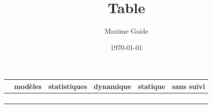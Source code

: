 \documentclass[11pt]{article}
\author{Maxime Gaide}
\date{\today}
\title{Table}
\begin{document}
\maketitle
\tableofcontents

\begin{center}
\begin{tabular}{llllll}
\hline
 & modèles & statistiques & dynamique & statique & sans suivi\\[0pt]
\hline
 &  &  &  &  & \\[0pt]
 &  &  &  &  & \\[0pt]
 &  &  &  &  & \\[0pt]
 &  &  &  &  & \\[0pt]
\hline
\end{tabular}
\end{center}
\end{document}
